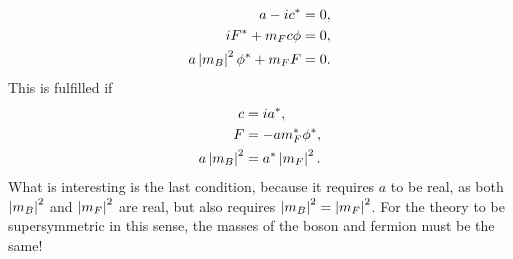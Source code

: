         \begin{subequations}
            \begin{align}
                a - ic^\ast                    & = 0, \\
                i F^\ast + m_F c \phi          & = 0, \\
                a\left|m_B\right|^2 \phi^\ast + m_F F & = 0.
            \end{align}
        \end{subequations}
        This is fulfilled if
        \begin{subequations}
            \begin{align}
                c            & = i a^\ast,              \\
                F            & = -a m_F^\ast \phi^\ast, \\
                a\left|m_B\right|^2 & = a^\ast \left|m_F\right|^2.
            \end{align}
        \end{subequations}
        What is interesting is the last condition, because it requires \(a\) to be real, as both \(\left|m_B\right|^2\) and \(\left|m_F\right|^2\) are real, but also requires \(\left|m_B\right|^2 = \left|m_F\right|^2\).
        For the theory to be supersymmetric in this sense, the masses of the boson and fermion must be the same!

